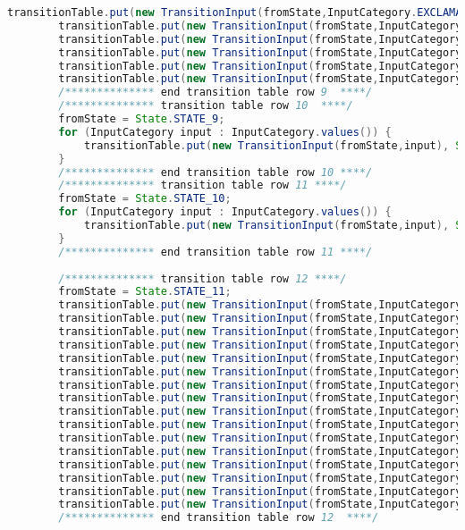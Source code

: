 \begin{lstlisting}[basicstyle=\miniscule,language=Java,caption=Implementation of transition table,label=listing:transition table]
		transitionTable.put(new TransitionInput(fromState,InputCategory.EXCLAMATION_MARK), State.STATE_7);
		transitionTable.put(new TransitionInput(fromState,InputCategory.DOT), State.STATE_7);
		transitionTable.put(new TransitionInput(fromState,InputCategory.SINGLE_QUOTE), State.STATE_7);
		transitionTable.put(new TransitionInput(fromState,InputCategory.PUNCT), State.STATE_7);
		transitionTable.put(new TransitionInput(fromState,InputCategory.OTHER_PRINTABLE), State.STATE_7);
		transitionTable.put(new TransitionInput(fromState,InputCategory.LINE_FEED), State.STATE_7);
		/************** end transition table row 9  ****/
		/************** transition table row 10  ****/
		fromState = State.STATE_9;
		for (InputCategory input : InputCategory.values()) {
			transitionTable.put(new TransitionInput(fromState,input), State.STATE_ERROR);
		}
		/************** end transition table row 10 ****/
		/************** transition table row 11 ****/
		fromState = State.STATE_10;
		for (InputCategory input : InputCategory.values()) {
			transitionTable.put(new TransitionInput(fromState,input), State.STATE_ERROR);
		}
		/************** end transition table row 11 ****/
		
		/************** transition table row 12 ****/
		fromState = State.STATE_11;
		transitionTable.put(new TransitionInput(fromState,InputCategory.LETTER), State.STATE_ERROR);
		transitionTable.put(new TransitionInput(fromState,InputCategory.DIGIT), State.STATE_11);
		transitionTable.put(new TransitionInput(fromState,InputCategory.UNDERSCORE), State.STATE_ERROR);
		transitionTable.put(new TransitionInput(fromState,InputCategory.SLASH_DIVIDE), State.STATE_ERROR);
		transitionTable.put(new TransitionInput(fromState,InputCategory.ASTERISK), State.STATE_ERROR);
		transitionTable.put(new TransitionInput(fromState,InputCategory.LESS_THAN), State.STATE_ERROR);
		transitionTable.put(new TransitionInput(fromState,InputCategory.GREATER_THAN), State.STATE_ERROR);
		transitionTable.put(new TransitionInput(fromState,InputCategory.PLUS), State.STATE_ERROR);
		transitionTable.put(new TransitionInput(fromState,InputCategory.HYPHEN_MINUS), State.STATE_ERROR);
		transitionTable.put(new TransitionInput(fromState,InputCategory.EQUAL), State.STATE_ERROR);
		transitionTable.put(new TransitionInput(fromState,InputCategory.EXCLAMATION_MARK), State.STATE_ERROR);
		transitionTable.put(new TransitionInput(fromState,InputCategory.DOT), State.STATE_12);
		transitionTable.put(new TransitionInput(fromState,InputCategory.SINGLE_QUOTE), State.STATE_ERROR);
		transitionTable.put(new TransitionInput(fromState,InputCategory.PUNCT), State.STATE_ERROR);
		transitionTable.put(new TransitionInput(fromState,InputCategory.OTHER_PRINTABLE), State.STATE_ERROR);
		transitionTable.put(new TransitionInput(fromState,InputCategory.LINE_FEED), State.STATE_ERROR);
		/************** end transition table row 12  ****/
		

\end{lstlisting}
